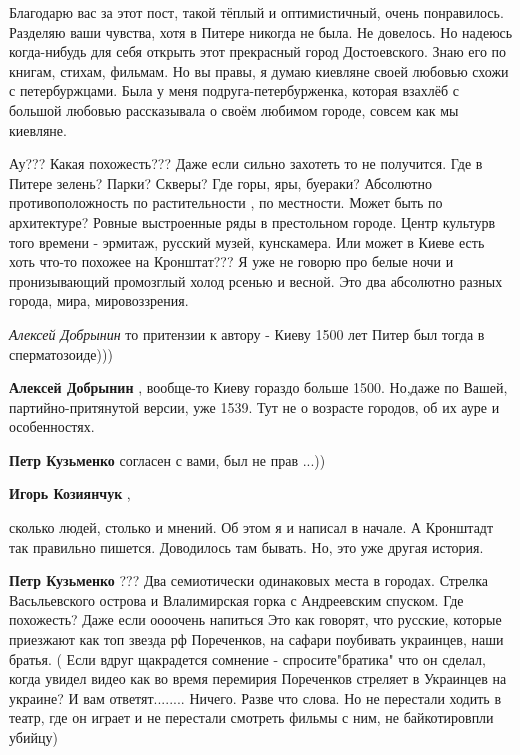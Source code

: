 \begin{itemize}
\begin{itemize}
\end{itemize} %


Благодарю вас за этот пост, такой тёплый и оптимистичный, очень понравилось.
Разделяю ваши чувства, хотя в Питере никогда не была. Не довелось. Но надеюсь
когда-нибудь для себя открыть этот прекрасный город Достоевского. Знаю его по
книгам, стихам, фильмам. Но вы правы, я думаю киевляне своей любовью схожи с
петербуржцами. Была у меня подруга-петербурженка, которая взахлёб с большой
любовью рассказывала о своём любимом городе, совсем как мы киевляне.


Ау??? Какая похожесть??? Даже если сильно захотеть то не получится. Где в
Питере зелень? Парки? Скверы? Где горы, яры, буераки? Абсолютно
противоположность по растительности , по местности. Может быть по архитектуре?
Ровные выстроенные ряды в престольном городе. Центр культурв того времени -
эрмитаж, русский музей, кунскамера. Или может в Киеве есть хоть что-то похожее
на Кронштат??? Я уже не говорю про белые ночи и пронизывающий промозглый холод
рсенью и весной. Это два абсолютно разных города, мира, мировоззрения.

\begin{itemize} %
\emph{Алексей Добрынин}
то притензии к автору - Киеву 1500 лет Питер был тогда в сперматозоиде)))

\begin{itemize} %
\textbf{Алексей Добрынин} , вообще-то Киеву гораздо больше 1500. Но,даже по Вашей, партийно-притянутой версии, уже 1539. Тут не о возрасте городов, об их ауре и особенностях.

\textbf{Петр Кузьменко} согласен с вами, был не прав ...))
\end{itemize} %

\textbf{Игорь Козиянчук} , 

сколько людей, столько и мнений. Об этом я и написал в начале. А Кронштадт так
правильно пишется. Доводилось там бывать. Но, это уже другая история.

\begin{itemize} %
\textbf{Петр Кузьменко} ??? Два семиотически одинаковых места в городах. Стрелка Васьльевского острова и Влалимирская горка с Андреевским спуском. Где похожесть? Даже если оооочень напиться
Это как говорят, что русские, которые приезжают как топ звезда рф Пореченков, на сафари поубивать украинцев, наши братья. ( Если вдруг щакрадется сомнение - спросите"братика" что он сделал, когда увидел видео как во время перемирия Пореченков стреляет в Украинцев на украине? И вам ответят........ Ничего. Разве что слова. Но не перестали ходить в театр, где он играет и не перестали смотреть фильмы с ним, не байкотировпли убийцу)


\end{itemize}
\end{itemize}
\end{itemize}
